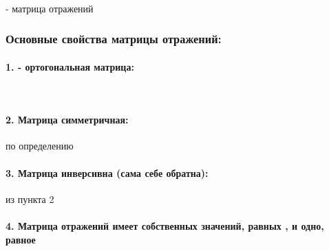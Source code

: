 \documentclass[
]{article}
\begin{document}
\hfill\break
{}\\
{}\strut \\
{}\strut \\
{}- матрица отражений

\subsubsection{Основные свойства матрицы
отражений:}\label{ux43eux441ux43dux43eux432ux43dux44bux435-ux441ux432ux43eux439ux441ux442ux432ux430-ux43cux430ux442ux440ux438ux446ux44b-ux43eux442ux440ux430ux436ux435ux43dux438ux439}

\paragraph{\texorpdfstring{1. {} - ортогональная
матрица:}{1.  - ортогональная матрица:}}\label{ux43eux440ux442ux43eux433ux43eux43dux430ux43bux44cux43dux430ux44f-ux43cux430ux442ux440ux438ux446ux430}

{}\strut \\
{}

\paragraph{\texorpdfstring{2. Матрица {}
симметричная:}{2. Матрица  симметричная:}}\label{ux43cux430ux442ux440ux438ux446ux430-ux441ux438ux43cux43cux435ux442ux440ux438ux447ux43dux430ux44f}

{} по определению

\paragraph{3. Матрица инверсивна (сама себе
обратна):}\label{ux43cux430ux442ux440ux438ux446ux430-ux438ux43dux432ux435ux440ux441ux438ux432ux43dux430-ux441ux430ux43cux430-ux441ux435ux431ux435-ux43eux431ux440ux430ux442ux43dux430}

{} из пункта 2

\paragraph{\texorpdfstring{4. Матрица отражений {} имеет {} собственных
значений, равных {}, и одно, равное
{}}{4. Матрица отражений  имеет  собственных значений, равных , и одно, равное }}\label{ux43cux430ux442ux440ux438ux446ux430-ux43eux442ux440ux430ux436ux435ux43dux438ux439-ux438ux43cux435ux435ux442-ux441ux43eux431ux441ux442ux432ux435ux43dux43dux44bux445-ux437ux43dux430ux447ux435ux43dux438ux439-ux440ux430ux432ux43dux44bux445-ux438-ux43eux434ux43dux43e-ux440ux430ux432ux43dux43eux435}
\end{document}

